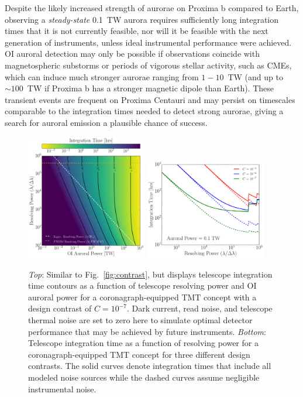 \documentclass{emulateapj}
\begin{document}
Despite the likely increased strength of aurorae on Proxima b compared to Earth, observing a {\em steady-state} 0.1~TW aurora requires sufficiently long integration times that it is not currently feasible, nor will it be feasible with the next generation of instruments, unless ideal instrumental performance were achieved. OI auroral detection may only be possible if observations coincide with magnetospheric substorms or periods of vigorous stellar activity, such as CMEs, which can induce much stronger aurorae ranging from $1 - 10$~TW (and up to ${\sim} 100$~TW if Proxima b has a stronger magnetic dipole than Earth). These transient events are frequent on Proxima Centauri \citep{Davenport2016} and may persist on timescales comparable to the integration times needed to detect strong aurorae, giving a search for auroral emission a plausible chance of success.

\begin{figure}
\centering
\includegraphics[width=0.47\textwidth]{exptime_B_inline_TMTC-7_noInstrumental.pdf}
\includegraphics[width=0.47\textwidth]{steadystate_contrast.pdf}
\caption{\textit{Top}: Similar to Fig.~\ref{fig:contrast}, but displays telescope integration time contours as a function of telescope resolving power and OI auroral power for a coronagraph-equipped TMT concept with a design contrast of $C = 10^{-7}$. Dark current, read noise, and telescope thermal noise are set to zero here to simulate optimal detector performance that may be achieved by future instruments. \textit{Bottom}: Telescope integration time as a function of resolving power for a coronagraph-equipped TMT concept for three different design contrasts.  The solid curves denote integration times that include all modeled noise sources while the dashed curves assume negligible instrumental noise.}
\label{fig:TMTC}
\end{figure}
\end{document}
